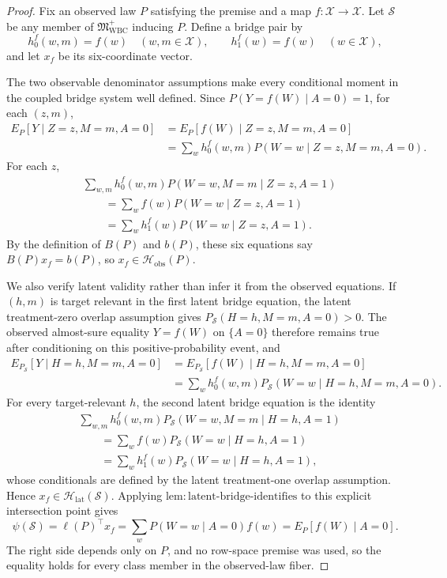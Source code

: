 \documentclass{article}
\begin{document}
\begin{proof}
Fix an observed law \(P\) satisfying the premise and a map
\(f:\mathcal X\to\mathcal X\).  Let \(\mathcal S\) be any member of
\(\mathfrak M_{\mathrm{WBC}}^{+}\) inducing \(P\).  Define a bridge pair by
\[
 h_0^f(w,m)=f(w)\quad(w,m\in\mathcal X),
 \qquad h_1^f(w)=f(w)\quad(w\in\mathcal X),
\]
and let \(x_f\) be its six-coordinate vector.

The two observable denominator assumptions make every conditional moment in
the coupled bridge system well defined.  Since
\(P(Y=f(W)\mid A=0)=1\), for each \((z,m)\),
\[
\begin{aligned}
 E_P[Y\mid Z=z,M=m,A=0]
 &=E_P[f(W)\mid Z=z,M=m,A=0]\\
 &=\sum_w h_0^f(w,m)P(W=w\mid Z=z,M=m,A=0).
\end{aligned}
\]
For each \(z\),
\[
\begin{aligned}
 &\sum_{w,m}h_0^f(w,m)P(W=w,M=m\mid Z=z,A=1)\\
 &\qquad=\sum_w f(w)P(W=w\mid Z=z,A=1)\\
 &\qquad=\sum_w h_1^f(w)P(W=w\mid Z=z,A=1).
\end{aligned}
\]
By the definition of \(B(P)\) and \(b(P)\), these six equations say
\(B(P)x_f=b(P)\), so \(x_f\in\mathcal H_{\mathrm{obs}}(P)\).

We also verify latent validity rather than infer it from the observed
equations.  If \((h,m)\) is target relevant in the first latent bridge
equation, the latent treatment-zero overlap assumption gives
\(P_{\mathcal S}(H=h,M=m,A=0)>0\).  The observed almost-sure equality
\(Y=f(W)\) on \(\{A=0\}\) therefore remains true after conditioning on
this positive-probability event, and
\[
\begin{aligned}
 E_{P_{\mathcal S}}[Y\mid H=h,M=m,A=0]
 &=E_{P_{\mathcal S}}[f(W)\mid H=h,M=m,A=0]\\
 &=\sum_w h_0^f(w,m)
 P_{\mathcal S}(W=w\mid H=h,M=m,A=0).
\end{aligned}
\]
For every target-relevant \(h\), the second latent bridge equation is the
identity
\[
\begin{aligned}
 &\sum_{w,m}h_0^f(w,m)
 P_{\mathcal S}(W=w,M=m\mid H=h,A=1)\\
 &\qquad=\sum_w f(w)P_{\mathcal S}(W=w\mid H=h,A=1)\\
 &\qquad=\sum_w h_1^f(w)P_{\mathcal S}(W=w\mid H=h,A=1),
\end{aligned}
\]
whose conditionals are defined by the latent treatment-one overlap
assumption.  Hence
\(x_f\in\mathcal H_{\mathrm{lat}}(\mathcal S)\).  Applying
\(\mathrm{lem{:}latent\text{-}bridge\text{-}identifies}\) to this explicit
intersection point gives
\[
 \psi(\mathcal S)=\ell(P)^{\top}x_f
 =\sum_w P(W=w\mid A=0)f(w)
 =E_P[f(W)\mid A=0].
\]
The right side depends only on \(P\), and no row-space premise was used, so
the equality holds for every class member in the observed-law fiber.


\end{proof}
\end{document}
